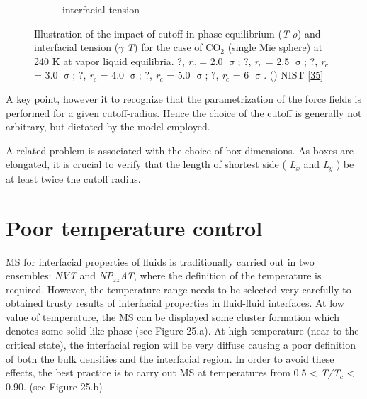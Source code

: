 \documentclass{scrbook}
\begin{document}
\begin{figure}
\begin{subfigure}{0.8\textwidth}
    \caption{interfacial tension}
	\end{subfigure}
\caption{Illustration of the impact of cutoff in phase equilibrium (\textit{T}
\textendash{} {${\rho}$}) and interfacial tension ({${\gamma}$} \textendash{}
\textit{T}) for the case of CO$_{2}$ (single Mie sphere) at 240 K at vapor
\textendash{} liquid equilibria. ?, \textit{r}$_{c}$ = 2.0 {${\upsigma}$}; ?,
\textit{r}$_{c}$ = 2.5 {${\upsigma}$}; ?, \textit{r}$_{c}$ = 3.0
{${\upsigma}$}; ?, \textit{r}$_{c}$ = 4.0 {${\upsigma}$}; ?, \textit{r}$_{c}$
= 5.0 {${\upsigma}$}; ?, \textit{r}$_{c}$ = 6 {${\upsigma}$}. (\textemdash{})
NIST [{\hyperref[ref-011]{35}}]
}
\label{fig:24}
\end{figure}

A key point, however it to recognize that the parametrization of the force
fields is performed for a given cutoff-radius. Hence the choice of the cutoff
is generally not arbitrary, but dictated by the model employed. 

A related problem is associated with the choice of box dimensions. As boxes are
elongated, it is crucial to verify that the length of shortest side
( \textit{L}$_{x}$ and \textit{L}$_{y}$ ) be at least twice the cutoff radius.

\section{Poor temperature control}

MS for interfacial properties of fluids is traditionally carried out in two
ensembles: \textit{NVT} and \textit{NP}$_{zz}$\textit{AT}, where the definition
of the temperature is required. However, the temperature range needs to be
selected very carefully to obtained trusty results of interfacial properties in
fluid-fluid interfaces. At low value of temperature, the MS can be displayed
some cluster formation which denotes some solid-like phase (see Figure 25.a).
At high temperature (near to the critical state), the interfacial region will
be very diffuse causing a poor definition of both the bulk densities and the
interfacial region. In order to avoid these effects, the best practice is to
carry out MS at temperatures from 0.5 {\textless} \textit{T/T}$_{c}$
{\textless} 0.90. (see Figure 25.b) 
\end{document}
